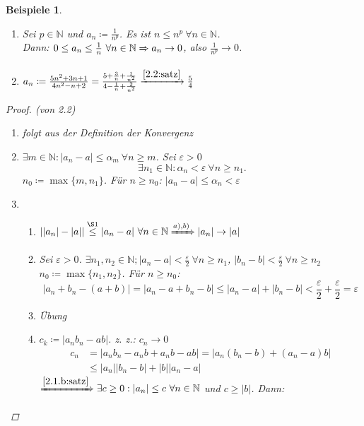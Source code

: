 \documentclass[14pt,titlepage,ngerman,a4paper,headsepline,DIV15,halfparskip*]{scrartcl}
\newcommand{\N}{\mathbb{N}}
\theoremstyle{named}
\theoremstyle{dotless}
\newtheorem*{beispiele}{Beispiele}
\begin{document}
\begin{beispiele} \
	\begin{enumerate}
		\item Sei $p \in \N$ und $a_{n} \coloneqq \frac{1}{n^{p}}$. Es ist $n \leq n^{p} ~\forall n \in \N$. \\
			Dann: $0 \leq a_{n} \leq \frac{1}{n} ~\forall n \in \N \xRightarrow[]{\label{2.2.e:satz}} a_{n} \rightarrow 0$, also $\frac{1}{n^{p}} \rightarrow 0$.
		\item $a_{n} \coloneqq \frac{5n^{2} + 3n + 1}{4n^{2} - n + 2} = \frac{5 + \frac{3}{n} + \frac{1}{n^{2}}}{4 - \frac{1}{n} + \frac{2}{n^{2}}} \xrightarrow[]{\ref{2.2:satz}} \frac{5}{4}$
	\end{enumerate}
	
	\begin{proof}(von 2.2) ~\
		\begin{enumerate}
			\item folgt aus der Definition der Konvergenz
			\item $\exists m \in \N: |a_{n} - a | \leq \alpha_{m} ~\forall n \geq m$. Sei $\varepsilon > 0$
				$$
		 		\exists n_{1} \in \N: \alpha_{n} < \varepsilon ~\forall n \geq n_{1}.
		 		$$
		 		$n_{0} \coloneqq \max \{ m , n_{1} \}$. Für $n \geq n_{0}$: $|a_{n} - a| \leq \alpha_{n} < \varepsilon$
			\item \begin{enumerate}
				\item $| |a_{n}| - |a|| \overset{\S 1}{\leq} |a_{n} - a| ~\forall n \in \N \xRightarrow[]{a), b)} |a_{n}| \rightarrow |a|$
				\item Sei $\varepsilon > 0$. $\exists n_{1}, n_{2} \in \N; |a_{n} - a| < \frac{\varepsilon}{2} ~\forall n \geq n_{1}$, $|b_{n} - b| < \frac{\varepsilon}{2} ~\forall n \geq n_{2}$ \\
					$n_{0} \coloneqq \max \{ n_{1}, n_{2} \}$. Für $n \geq n_{0}$:
					$$
						|a_{n} + b_{n} - (a + b)| = |a_{n} - a + b_{n} - b| \leq |a_{n} - a| + |b_{n} - b| < \frac{\varepsilon}{2} + \frac{\varepsilon}{2} = \varepsilon
					$$
				\item Übung
				\item $c_{k} \coloneqq |a_{n} b_{n} - ab|$. z. z.: $c_{n} \rightarrow 0$
					\begin{align*}
						c_{n} & = |a_{n}b_{n} - a_{n}b + a_{n}b - ab| = |a_{n}(b_{n} - b)+ (a_{n} - a)b| \\
							  & \leq |a_{n}||b_{n} - b| + |b||a_{n}-a|
					\end{align*}
					$\xRightarrow[]{\ref{2.1.b:satz}} \exists c \geq 0 : |a_{n}| \leq c ~\forall n \in \N$ und $c \geq |b|$. Dann:

\end{enumerate}
\end{enumerate}
\end{proof}
\end{beispiele}
\end{document}
